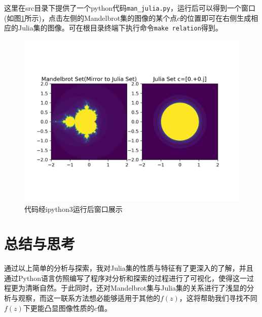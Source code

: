 \documentclass[a4paper]{ctexart}
\begin{document}
这里在src目录下提供了一个python代码\texttt{man\_julia.py}\cite{julia_zhihuRe}，运行后可以得到一个窗口(如图\ref{tu5}所示)，点击左侧的Mandelbrot集的图像的某个点$c$的位置即可在右侧生成相应的Julia集的图像。可在根目录终端下执行命令\texttt{make relation}得到。
\begin{figure}[H]
	\centering
	\includegraphics[width=.8\textwidth]{./png/300dpi/show.png}
	\caption{代码经ipython3运行后窗口展示}
	\label{tu5}
\end{figure}

\section{总结与思考}
通过以上简单的分析与探索，我对Julia集的性质与特征有了更深入的了解，并且通过Python语言仿照编写了程序对分析和探索的过程进行了可视化，使得这一过程更为清晰自然。于此同时，还对Mandelbrot集与Julia集的关系进行了浅显的分析与观察，而这一联系方法想必能够适用于其他的$f(z)$，这将帮助我们寻找不同$f(z)$下更能凸显图像性质的$c$值。

\centering

	
\end{document}
